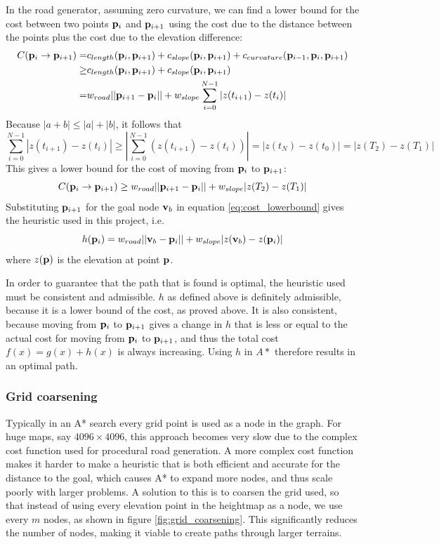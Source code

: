 In the road generator, assuming zero curvature, we can find a lower bound for the cost between two points ${\mathbf p}_i$ and ${\mathbf p}_{i+1}$ using the cost due to the distance between the points plus the cost due to the elevation difference:
\begin{align*}
C({\mathbf p}_i \to {\mathbf p}_{i+1}) = & c_{length}({\mathbf p}_i, {\mathbf p}_{i+1}) + c_{slope}({\mathbf p}_i, {\mathbf p}_{i+1}) + c_{curvature}({\mathbf p}_{i-1}, {\mathbf p}_i, {\mathbf p}_{i+1})\\
                                 \geq & c_{length}({\mathbf p}_i, {\mathbf p}_{i+1}) + c_{slope}({\mathbf p}_i, {\mathbf p}_{i+1}) \\
                                 = & w_{road}||{\mathbf p}_{i+1} - {\mathbf p}_i|| + w_{slope}\sum_{i=0}^{N-1} |z(t_{i+1})-z(t_i)|
\end{align*}
Because $|a+b| \leq |a|+|b|$, it follows that
$$
\sum_{i=0}^{N-1} |z(t_{i+1})-z(t_i)| \geq \left|\sum_{i=0}^{N-1} (z(t_{i+1})-z(t_i))\right| = |z(t_{N})-z(t_0)| = |z(T_2)-z(T_1)|
$$
This gives a lower bound for the cost of moving from ${\mathbf p}_i$ to ${\mathbf p}_{i+1}$:
\begin{equation}
C({\mathbf p}_i \to {\mathbf p}_{i+1}) \geq w_{road}||{\mathbf p}_{i+1} - {\mathbf p}_i|| + w_{slope}|z(T_2)-z(T_1)|
\label{eq:cost_lowerbound}
\end{equation}
Substituting ${\mathbf p}_{i+1}$ for the goal node ${\mathbf v}_b$ in equation \ref{eq:cost_lowerbound} gives the heuristic used in this project, i.e.
\begin{equation}
h({\mathbf p}_i) = w_{road}||{\mathbf v}_b - {\mathbf p}_i|| + w_{slope}|z({\mathbf v}_b)-z({\mathbf p}_i)|
\label{eq:astar_heuristic}
\end{equation}
where $z({\mathbf p})$ is the elevation at point ${\mathbf p}$.

In order to guarantee that the path that is found is optimal, the heuristic used must be consistent and admissible. $h$ as defined above is definitely admissible, because it is a lower bound of the cost, as proved above. It is also consistent, because moving from ${\mathbf p}_i$ to ${\mathbf p}_{i+1}$ gives a change in $h$ that is less or equal to the actual cost for moving from ${\mathbf p}_i$ to ${\mathbf p}_{i+1}$, and thus the total cost $f(x) = g(x)+h(x)$ is always increasing. Using $h$ in $A*$ therefore results in an optimal path.

\subsubsection{Grid coarsening}
Typically in an A* search every grid point is used as a node in the graph. For huge maps, say $4096\times 4096$, this approach becomes very slow due to the complex cost function used for procedural road generation. A more complex cost function makes it harder to make a heuristic that is both efficient and accurate for the distance to the goal, which causes A* to expand more nodes, and thus scale poorly with larger problems. A solution to this is to coarsen the grid used, so that instead of using every elevation point in the heightmap as a node, we use every $m$ nodes, as shown in figure \ref{fig:grid_coarsening}. This significantly reduces the number of nodes, making it viable to create paths through larger terrains.

